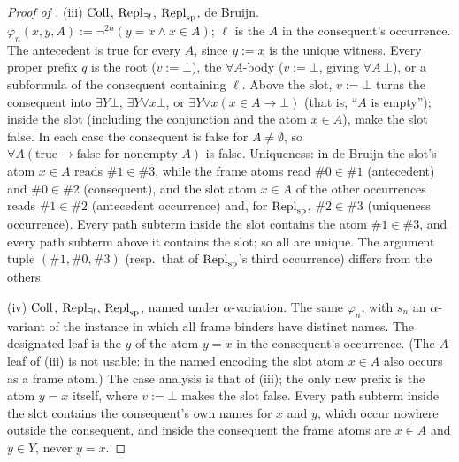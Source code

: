 \begin{proof}[Proof of ]
(iii) $\mathrm{Coll}$, $\mathrm{Repl}_{\exists!}$, $\mathrm{Repl}_{\mathrm{sp}}$, de Bruijn. $\varphi_n(x,y,A):=\neg^{2n}(y=x\wedge x\in A)$; $\ell$ is the $A$ in the
consequent's occurrence. The antecedent is true for every $A$, since $y:=x$ is the unique witness. Every proper prefix
$q$ is the root ($v:=\bot$), the $\forall A$-body ($v:=\bot$, giving $\forall A\,\bot$), or a subformula of the
consequent containing $\ell$. Above the slot, $v:=\bot$ turns the consequent into $\exists Y\bot$, $\exists Y\forall
x\bot$, or $\exists Y\forall x(x\in A\to\bot)$ (that is, ``$A$ is empty''); inside the slot (including the conjunction and
the atom $x\in A$), make the slot false. In each case the consequent is false for $A\ne\emptyset$, so
$\forall A(\text{true}\to\text{false for nonempty }A)$ is false. Uniqueness: in de Bruijn the slot's atom $x\in A$
reads $\#1\in\#3$, while the frame atoms read $\#0\in\#1$ (antecedent) and $\#0\in\#2$ (consequent), and the slot atom
$x\in A$ of the other occurrences reads $\#1\in\#2$ (antecedent occurrence) and, for $\mathrm{Repl}_{\mathrm{sp}}$, $\#2\in\#3$ (uniqueness
occurrence). Every path subterm inside the slot contains the atom $\#1\in\#3$, and every path subterm above it contains
the slot; so all are unique. The argument tuple $(\#1,\#0,\#3)$ (resp.\ that of $\mathrm{Repl}_{\mathrm{sp}}$'s third occurrence) differs
from the others.

(iv) $\mathrm{Coll}$, $\mathrm{Repl}_{\exists!}$, $\mathrm{Repl}_{\mathrm{sp}}$, named under $\alpha$-variation. The same $\varphi_n$, with $s_n$ an $\alpha$-variant
of the instance in which all frame binders have distinct names. The designated leaf is the $y$ of the atom $y=x$ in the
consequent's occurrence. (The $A$-leaf of (iii) is not usable: in the named encoding the slot atom $x\in A$ also occurs as
a frame atom.) The case analysis is that of (iii); the only new prefix is the atom $y=x$ itself, where $v:=\bot$ makes
the slot false. Every path subterm inside the slot contains the consequent's own names for $x$ and $y$, which occur
nowhere outside the consequent, and inside the consequent the frame atoms are $x\in A$ and $y\in Y$, never $y=x$.
\end{proof}

